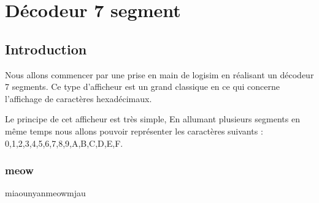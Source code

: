 \section{Décodeur 7 segment}
\subsection{Introduction}
Nous allons commencer par une prise en main de logisim en réalisant un décodeur 7 segments. Ce type d'afficheur est un grand classique en ce qui concerne l'affichage de caractères hexadécimaux.

Le principe de cet afficheur est très simple, En allumant plusieurs segments en même temps nous allons pouvoir représenter les caractères suivants :
0,1,2,3,4,5,6,7,8,9,A,B,C,D,E,F.

\begin{center}
\end{center}

\subsubsection{meow}
miaounyanmeowmjau

